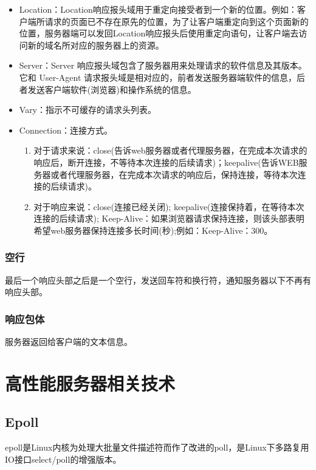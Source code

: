 \documentclass[bachelor]{thesis-uestc}
\begin{document}
\begin{itemize}
	\item Location：Location响应报头域用于重定向接受者到一个新的位置。例如：客户端所请求的页面已不存在原先的位置，为了让客户端重定向到这个页面新的位置，服务器端可以发回Location响应报头后使用重定向语句，让客户端去访问新的域名所对应的服务器上的资源。
	\item Server：Server 响应报头域包含了服务器用来处理请求的软件信息及其版本。它和 User-Agent 请求报头域是相对应的，前者发送服务器端软件的信息，后者发送客户端软件(浏览器)和操作系统的信息。
	\item Vary：指示不可缓存的请求头列表。
	\item Connection：连接方式。
	\begin{enumerate}
		\item 对于请求来说：close(告诉web服务器或者代理服务器，在完成本次请求的响应后，断开连接，不等待本次连接的后续请求)；keepalive(告诉WEB服务器或者代理服务器，在完成本次请求的响应后，保持连接，等待本次连接的后续请求)。
		\item 对于响应来说：close(连接已经关闭); keepalive(连接保持着，在等待本次连接的后续请求); Keep-Alive：如果浏览器请求保持连接，则该头部表明希望web服务器保持连接多长时间(秒);例如：Keep-Alive：300。
	\end{enumerate}
\end{itemize}

\subsubsection*{空行}

最后一个响应头部之后是一个空行，发送回车符和换行符，通知服务器以下不再有响应头部。

\subsubsection*{响应包体}

服务器返回给客户端的文本信息。

\section{高性能服务器相关技术}


\subsection{Epoll}

epoll是Linux内核为处理大批量文件描述符而作了改进的poll，是Linux下多路复用IO接口select/poll的增强版本。
\end{document}
